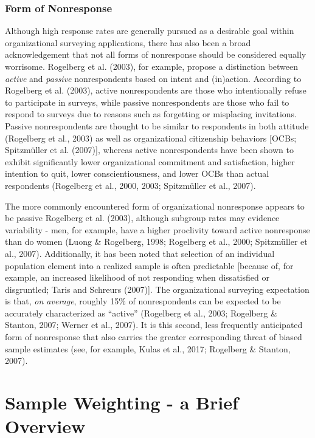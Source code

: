 \documentclass[
  man,floatsintext]{apa7}
\begin{document}
\hypertarget{form-of-nonresponse}{%
\subsubsection{Form of Nonresponse}\label{form-of-nonresponse}}

Although high response rates are generally pursued as a desirable goal within organizational surveying applications, there has also been a broad acknowledgement that not all forms of nonresponse should be considered equally worrisome. Rogelberg et al. (2003), for example, propose a distinction between \emph{active} and \emph{passive} nonrespondents based on intent and (in)action. According to Rogelberg et al. (2003), active nonrespondents are those who intentionally refuse to participate in surveys, while passive nonrespondents are those who fail to respond to surveys due to reasons such as forgetting or misplacing invitations. Passive nonrespondents are thought to be similar to respondents in both attitude (Rogelberg et al., 2003) as well as organizational citizenship behaviors {[}OCBs; Spitzmüller et al. (2007){]}, whereas active nonrespondents have been shown to exhibit significantly lower organizational commitment and satisfaction, higher intention to quit, lower conscientiousness, and lower OCBs than actual respondents (Rogelberg et al., 2000, 2003; Spitzmüller et al., 2007).

The more commonly encountered form of organizational nonresponse appears to be passive Rogelberg et al. (2003), although subgroup rates may evidence variability - men, for example, have a higher proclivity toward active nonresponse than do women (Luong \& Rogelberg, 1998; Rogelberg et al., 2000; Spitzmüller et al., 2007). Additionally, it has been noted that selection of an individual population element into a realized sample is often predictable {[}because of, for example, an increased likelihood of not responding when dissatisfied or disgruntled; Taris and Schreurs (2007){]}. The organizational surveying expectation is that, \emph{on average}, roughly 15\% of nonrespondents can be expected to be accurately characterized as ``active'' (Rogelberg et al., 2003; Rogelberg \& Stanton, 2007; Werner et al., 2007). It is this second, less frequently anticipated form of nonresponse that also carries the greater corresponding threat of biased sample estimates (see, for example, Kulas et al., 2017; Rogelberg \& Stanton, 2007).

\hypertarget{sample-weighting---a-brief-overview}{%
\section{Sample Weighting - a Brief Overview}\label{sample-weighting---a-brief-overview}}
\end{document}
